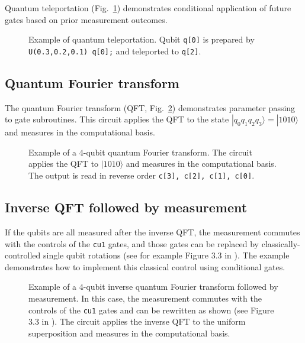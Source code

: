 \documentclass[USenglish,12pt,fleqn]{article} %
\newcommand*{\code}{\texttt}
\begin{document}
Quantum teleportation (Fig.~\ref{fig:example:teleport}) demonstrates conditional application of future gates based on prior measurement outcomes.

\begin{figure}
\centering

\caption{Example of quantum teleportation. Qubit \code{q[0]} is prepared by \code{U(0.3,0.2,0.1) q[0];} and teleported to \code{q[2]}.
\label{fig:example:teleport}}
\end{figure}

\subsection{Quantum Fourier transform}
The quantum Fourier transform (QFT, Fig.~\ref{fig:example:qft}) demonstrates parameter passing to gate subroutines. This circuit applies the QFT to the state $|q_0 q_1 q_2 q_3\rangle=|1010\rangle$ and measures in the computational basis.

\begin{figure}
\centering

\caption{Example of a $4$-qubit quantum Fourier transform. The circuit applies the QFT to $|1010\rangle$ and measures in the computational basis. The output is read in reverse order \code{c[3], c[2], c[1], c[0]}. \label{fig:example:qft}}
\end{figure}

\subsection{Inverse QFT followed by measurement}

If the qubits are all measured after the inverse QFT, the measurement commutes with the controls of the \code{cu1} gates, and those gates can be replaced by classically-controlled single qubit rotations (see for example Figure 3.3 in \cite{mermin}). The example demonstrates how to implement this classical control using conditional gates.

\begin{figure}
\hspace{-0.8cm}
\begin{minipage}{.8\textwidth}

\end{minipage}
\caption{Example of a $4$-qubit inverse quantum Fourier transform followed by measurement. In this case, the measurement commutes with the controls of the \code{cu1} gates and can be rewritten as shown (see Figure 3.3 in \cite{mermin}). The circuit applies the inverse QFT to the uniform superposition and measures in the computational basis. 
\label{fig:example:iqft}}
\end{figure}
\end{document}
